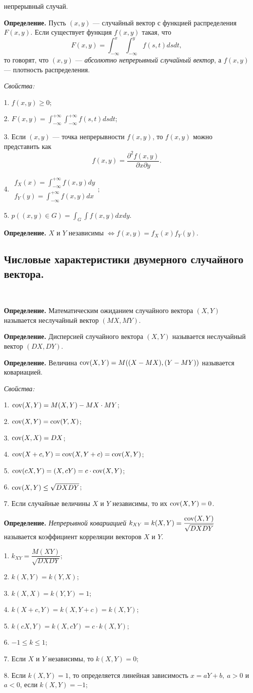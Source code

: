 \documentclass[9pt]{article}
\begin{document}
 непрерывный случай.
\par\textbf{Определение.} Пусть \((x,y)\) --- случайный вектор с функцией распределения \(F(x,y)\). Если существует функция \(f(x,y)\) такая, что \[F(x,y)=\int_{-\infty}^x\int_{-\infty}^yf(s,t)dsdt,\] то говорят, что \((x,y)\) --- \textit{абсолютно непрерывный случайный вектор}, а \(f(x,y)\) --- плотность распределения.
\par\textit{Свойства:}
\par1. \(f(x,y)\ge0\);
\par2. \(F(x,y)=\int_{-\infty}^{+\infty}\int_{-\infty}^{+\infty}f(s,t)dsdt\);
\par3. Если \((x,y)\) --- точка непрерывности \(f(x,y)\), то \(f(x,y)\) можно представить как \[f(x,y)=\dfrac{\partial^2f(x,y)}{\partial x\partial y}.\]
\par4. \(\begin{array}{l}
    f_X(x)=\int_{-\infty}^{+\infty}f(x,y)dy \\
    f_Y(y)=\int_{-\infty}^{+\infty}f(x,y)dx
\end{array};\)
\par5. \(p((x,y)\in G)=\int_G\int f(x,y)dxdy\).
\par\textbf{Определение.} \(X\) и \(Y\) независимы \(\Leftrightarrow f(x,y)=f_X(x)f_Y(y)\).

\subsection{Числовые характеристики двумерного случайного вектора.}

\ 
\par\textbf{Определение.} Математическим ожиданием случайного вектора \((X,Y)\) называется неслучайный вектор \((MX, MY)\).
\par\textbf{Определение.} Дисперсией случайного вектора \((X,Y)\) называется неслучайный вектор \((DX,DY)\).
\par\textbf{Определение.} Величина \(\operatorname{cov}(X,Y)=M((X-MX), (Y-MY))\) называется ковариацией.
\par\textit{Свойства:}
\par1. \(\operatorname{cov}(X,Y)=M(X,Y)-MX\cdot MY\);
\par2. \(\operatorname{cov}(X,Y)=\operatorname{cov}(Y,X)\);
\par3. \(\operatorname{cov}(X,X)=DX\);
\par4. \(\operatorname{cov}(X+c,Y)=\operatorname{cov}(X,Y+c)=\operatorname{cov}(X,Y)\);
\par5. \(\operatorname{cov}(cX,Y)=(X,cY)=c\cdot \operatorname{cov}(X,Y)\);
\par6. \(\operatorname{cov}(X,Y)\le\sqrt{DXDY}\);
\par7. Если случайные величины \(X\) и \(Y\) независимы, то их \(\operatorname{cov}(X,Y)=0\).

\par\textbf{Определение.} \textit{Непрерывной ковариацией} \(k_{XY}=k(X,Y)=\dfrac{\operatorname{cov}(X,Y)}{\sqrt{DXDY}}\) называется коэффициент корреляции векторов \(X\) и \(Y\).
\par1. \(k_{XY}=\dfrac{M(XY)}{\sqrt{DXDY}}\);
\par2. \(k(X,Y)=k(Y,X)\);
\par3. \(k(X,X)=k(Y,Y)=1\);
\par4. \(k(X+c,Y)=k(X,Y+c)=k(X,Y)\);
\par5. \(k(cX,Y)=k(X,cY)=c\cdot k(X,Y)\);
\par6. \(-1\le k\le1\);
\par7. Если \(X\) и \(Y\) независимы, то \(k(X,Y)=0\);
\par8. Если \(k(X,Y)=1\), то определяется линейная зависимость \(x=aY+b,\ a>0\) и \(a<0\), если \(k(X,Y)=-1\);
\end{document}
